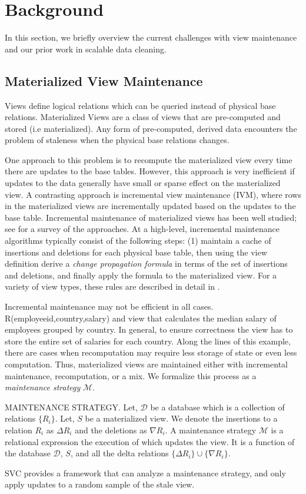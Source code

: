 \section{Background}\label{sec-background}
In this section, we briefly overview the current challenges with view maintenance and
our prior work in scalable data cleaning.

\subsection{Materialized View Maintenance}\label{subsec-inc}
Views define logical relations which can be queried instead of physical base relations.
Materialized Views are a class of views that are pre-computed and stored (i.e materialized).
Any form of pre-computed, derived data encounters the problem of staleness when the physical base relations changes.

One approach to this problem is to recompute the materialized view every time there are updates to the base tables.
However, this approach is very inefficient if updates to the data generally have small or sparse effect on the materialized view. 
A contrasting approach is incremental view maintenance (IVM), where rows in the materialized views are incrementally updated based on the updates to the base table.
Incremental maintenance of materialized views has been well studied; see \cite{chirkova2011materialized} for a survey of the approaches. 
At a high-level, incremental maintenance algorithms typically consist of the following steps: (1) maintain a cache of insertions and deletions for each physical base table, then using the view definition derive a \emph{change propagation formula} in terms of the set of insertions and deletions, and finally apply the formula to the materialized view.
For a variety of view types, these rules are described in detail in \cite{DBLP:journals/vldb/KochAKNNLS14, DBLP:conf/pods/Koch10}.

Incremental maintenance may not be efficient in all cases.
R(employeeid,country,salary) and view that calculates the median salary of employees grouped by country.  
In general, to ensure correctness the view has to store the entire set of salaries for each country.
Along the lines of this example, there are cases when recomputation may require less storage of state or even less computation.
Thus, materialized views are maintained either with incremental maintenance, recomputation, or a mix.
We formalize this process as a \emph{maintenance strategy} $\mathcal{M}$.
\begin{definition} MAINTENANCE STRATEGY.
Let, $\mathcal{D}$ be a database which is a collection of relations $\{R_i\}$.
Let, $S$ be a materialized view.
We denote the insertions to a relation $R_i$ as $\Delta R_i$ and the deletions as $\nabla R_i$.
A maintenance strategy $\mathcal{M}$ is a relational expression the execution of which updates the view.
It is a function of the database $\mathcal{D}$, $S$, and all the delta relations $\{\Delta R_i\} \cup \{\nabla R_i\}$.
\end{definition}
SVC provides a framework that can analyze a maintenance strategy, and only apply updates to a random sample of the stale view.

